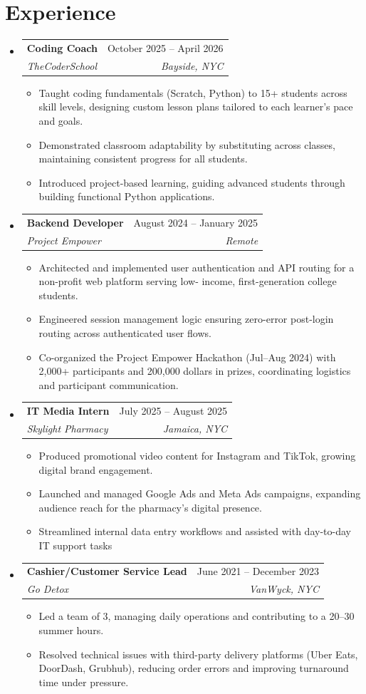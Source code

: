 \documentclass[letterpaper, 11pt]{article}
\makeatletter
\newcommand{\resumeItem}[1]{
  \item\small{
    {#1 \vspace{-2pt}}
  }
}
\newcommand{\resumeSubheading}[4]{
  \vspace{-2pt}\item
    \begin{tabular*}{0.97\textwidth}[t]{l@{\extracolsep{\fill}}r}
      \textbf{#1} & #2 \\
      \textit{\small#3} & \textit{\small #4} \\
    \end{tabular*}\vspace{-7pt}
}
\newcommand{\resumeSubHeadingListStart}{\begin{itemize}[leftmargin=0.15in, label={}]}
\newcommand{\resumeSubHeadingListEnd}{\end{itemize}}
\newcommand{\resumeItemListStart}{\begin{itemize}}
\newcommand{\resumeItemListEnd}{\end{itemize}\vspace{-5pt}}
\makeatother
\begin{document}
\section{Experience}
    \resumeSubHeadingListStart
        \resumeSubheading
        {Coding Coach}{October 2025 -- April 2026}
        {TheCoderSchool}{Bayside, NYC}
            \resumeItemListStart
                \resumeItem{Taught coding fundamentals (Scratch, Python) to 15+ students across skill levels, designing custom lesson
                plans tailored to each learner's pace and goals.}
                \resumeItem{Demonstrated classroom adaptability by substituting across classes, maintaining consistent progress for all
                students.}
                \resumeItem{Introduced project-based learning, guiding advanced students through building functional Python
                applications.}
            \resumeItemListEnd
        \resumeSubheading
        {Backend Developer}{August 2024 -- January 2025}
        {Project Empower}{Remote}
            \resumeItemListStart
                \resumeItem{Architected and implemented user authentication and API routing for a non-profit web platform serving low-
                income, first-generation college students.}
                \resumeItem{Engineered session management logic ensuring zero-error post-login routing across authenticated user
                flows.}
                \resumeItem{Co-organized the Project Empower Hackathon (Jul–Aug 2024) with 2,000+ participants and 200,000 dollars in
                prizes, coordinating logistics and participant communication.}
            \resumeItemListEnd
        \resumeSubheading
        {IT Media Intern}{July 2025 -- August 2025}
        {Skylight Pharmacy}{Jamaica, NYC}
            \resumeItemListStart
                \resumeItem{Produced promotional video content for Instagram and TikTok, growing digital brand engagement.}
                \resumeItem{Launched and managed Google Ads and Meta Ads campaigns, expanding audience reach for the
                pharmacy's digital presence.}
                \resumeItem{Streamlined internal data entry workflows and assisted with day-to-day IT support tasks}
            \resumeItemListEnd
        \resumeSubheading
        {Cashier/Customer Service Lead}{June 2021 -- December 2023}
        {Go Detox}{VanWyck, NYC}
            \resumeItemListStart
                \resumeItem{Led a team of 3, managing daily operations and contributing to a 20–30%
                summer hours.}
                \resumeItem{Resolved technical issues with third-party delivery platforms (Uber Eats, DoorDash, Grubhub), reducing
                order errors and improving turnaround time under pressure.}
            \resumeItemListEnd
    \resumeSubHeadingListEnd
\end{document}
